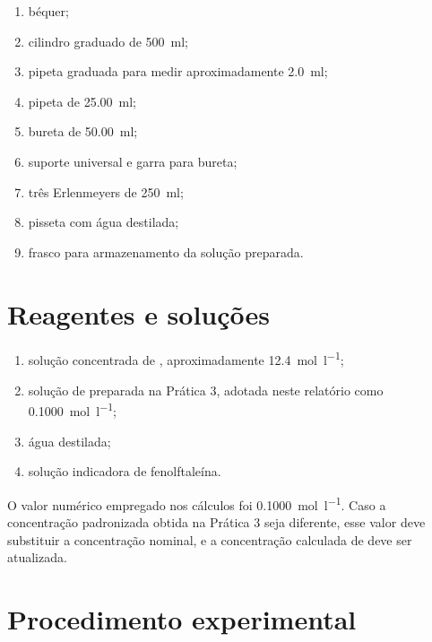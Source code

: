 \documentclass[a4paper,12pt]{article}
\newcommand{\ConcHCl}{0.1000}
\begin{document}
\begin{enumerate}[label=\alph*.]
  \item béquer;
  \item cilindro graduado de \qty{500}{\milli\litre};
  \item pipeta graduada para medir aproximadamente \qty{2.0}{\milli\litre};
  \item pipeta de \qty{25.00}{\milli\litre};
  \item bureta de \qty{50.00}{\milli\litre};
  \item suporte universal e garra para bureta;
  \item três Erlenmeyers de \qty{250}{\milli\litre};
  \item pisseta com água destilada;
  \item frasco para armazenamento da solução preparada.
\end{enumerate}

\section{Reagentes e soluções}

\begin{enumerate}[label=\alph*.]
  \item solução concentrada de , aproximadamente
        \qty{12.4}{\mole\per\litre};
  \item solução de  preparada na Prática 3, adotada neste relatório
        como \qty{\ConcHCl}{\mole\per\litre};
  \item água destilada;
  \item solução indicadora de fenolftaleína.
\end{enumerate}

\begin{tcolorbox}[
  title=Observação sobre a concentração do \ce{HCl},
  colback=quadrocinza,
  colframe=black!65,
  boxrule=0.6pt,
  arc=1mm
]
O valor numérico empregado nos cálculos foi
\qty{\ConcHCl}{\mole\per\litre}. Caso a concentração padronizada obtida na
Prática 3 seja diferente, esse valor deve substituir a concentração nominal,
e a concentração calculada de  deve ser atualizada.
\end{tcolorbox}

\section{Procedimento experimental}
\end{document}
